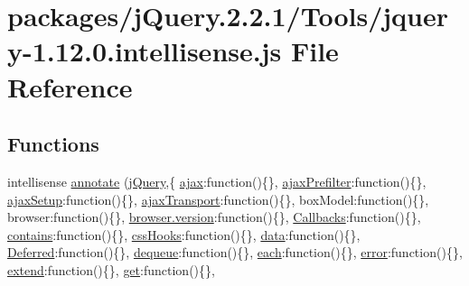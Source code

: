 \hypertarget{jquery-1_812_80_8intellisense_8js}{}\section{packages/j\+Query.2.2.1/\+Tools/jquery-\/1.12.0.intellisense.\+js File Reference}
\label{jquery-1_812_80_8intellisense_8js}
\subsection*{Functions}
\begin{DoxyCompactItemize}
\item 
intellisense \hyperlink{jquery-1_812_80_8intellisense_8js_ad1527630d45bb696c9bc5e21e4bd7355}{annotate} (\hyperlink{jquery_8rateyo_8min_8js_a2b1d6f9c448e3ce72f4e1865d6e38d2c}{j\+Query},\{ \textquotesingle{}\hyperlink{jquery-2_82_81-vsdoc_8js_a3c9e2ac71a76356869090140308936dc}{ajax}\textquotesingle{}\+:function()\{\}, \textquotesingle{}\hyperlink{jquery-2_82_81-vsdoc_8js_a414ccda111294ca405827d1f416a7512}{ajax\+Prefilter}\textquotesingle{}\+:function()\{\}, \textquotesingle{}\hyperlink{jquery-2_82_81-vsdoc_8js_a3b12f4f2a83dfdae4e81bcaeaf2a2f42}{ajax\+Setup}\textquotesingle{}\+:function()\{\}, \textquotesingle{}\hyperlink{jquery-2_82_81-vsdoc_8js_afe3900e3907689b52735b9c2bf0b8ff6}{ajax\+Transport}\textquotesingle{}\+:function()\{\}, \textquotesingle{}box\+Model\textquotesingle{}\+:function()\{\}, \textquotesingle{}browser\textquotesingle{}\+:function()\{\}, \textquotesingle{}\hyperlink{_shame_the_thrones_2_scripts_2js_2thirdparty_2bootstrap_8min_8js_af15ce22371f8af3b38c7d40a4987b366}{browser.\+version}\textquotesingle{}\+:function()\{\}, \textquotesingle{}\hyperlink{jquery-2_82_80_8intellisense_8js_add8d59d25831bb9b171fdbee8a18795b}{Callbacks}\textquotesingle{}\+:function()\{\}, \textquotesingle{}\hyperlink{tsc_8js_a7665f31886bcd4ed39aa87c79ed64340}{contains}\textquotesingle{}\+:function()\{\}, \textquotesingle{}\hyperlink{jquery-2_82_81-vsdoc_8js_a9966a63bdc4e33753dbe36a83e7f96bf}{css\+Hooks}\textquotesingle{}\+:function()\{\}, \textquotesingle{}\hyperlink{jquery-2_82_81-vsdoc_8js_a609407b3456fdc3c5671a9fc4a226ff7}{data}\textquotesingle{}\+:function()\{\}, \textquotesingle{}\hyperlink{jquery-2_82_80_8intellisense_8js_ab355ffd82371d88c17da7c1dae9e8829}{Deferred}\textquotesingle{}\+:function()\{\}, \textquotesingle{}\hyperlink{jquery-2_82_81-vsdoc_8js_a721f718178dce35dc9a4bf9fe8b6de23}{dequeue}\textquotesingle{}\+:function()\{\}, \textquotesingle{}\hyperlink{jquery-2_82_80_8min_8js_a53c7b9ea828db458b7ad4c5bd7d20b58}{each}\textquotesingle{}\+:function()\{\}, \textquotesingle{}\hyperlink{jquery-2_82_81-vsdoc_8js_acd25716dc66c2c57df2fc97807ffbddf}{error}\textquotesingle{}\+:function()\{\}, \textquotesingle{}\hyperlink{jquery-2_82_80_8min_8js_a798d2452a6cada224fa212d35d4e0325}{extend}\textquotesingle{}\+:function()\{\}, \textquotesingle{}\hyperlink{jquery-2_82_81-vsdoc_8js_a904e08d31e9d836b29247ea5e274ae83}{get}\textquotesingle{}\+:function()\{\}, 
\end{DoxyCompactItemize}
